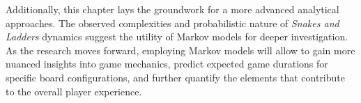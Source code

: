 Additionally, this chapter lays the groundwork for a more advanced analytical approaches. The observed complexities and probabilistic nature of \textit{Snakes and Ladders} dynamics suggest the utility of Markov models for deeper investigation. As the research moves forward, employing Markov models will allow to gain more nuanced insights into game mechanics, predict expected game durations for specific board configurations, and further quantify the elements that contribute to the overall player experience. 
